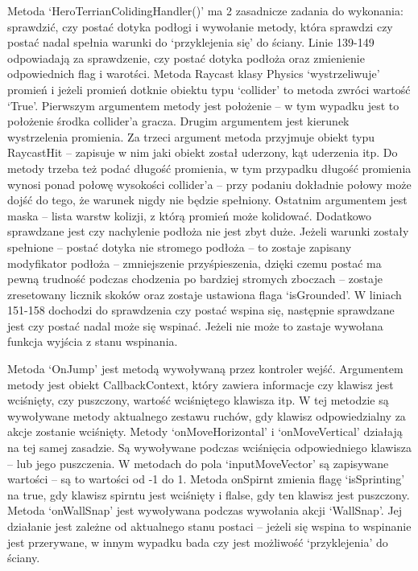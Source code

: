 \documentclass[12pt,twoside]{article}
\begin{document}
Metoda `HeroTerrianColidingHandler()' ma 2 zasadnicze zadania do wykonania:
sprawdzić, czy postać dotyka podłogi i wywołanie metody, która sprawdzi czy
postać nadal spełnia warunki do `przyklejenia się' do ściany. Linie 139-149
odpowiadają za sprawdzenie, czy postać dotyka podłoża oraz zmienienie
odpowiednich flag i warotści. Metoda Raycast klasy Physics `wystrzeliwuje'
promień i jeżeli promień dotknie obiektu  typu `collider' to metoda zwróci
wartość `True'. Pierwszym argumentem metody jest położenie -- w tym wypadku jest
to położenie środka collider’a gracza. Drugim argumentem jest kierunek
wystrzelenia promienia. Za trzeci argument metoda przyjmuje obiekt typu
RaycastHit -- zapisuje w nim jaki obiekt został uderzony, kąt uderzenia itp. Do
metody trzeba też podać długość promienia, w tym przypadku długość promienia
wynosi ponad połowę wysokości collider’a -- przy podaniu dokładnie połowy może
dojść do tego, że warunek nigdy nie będzie spełniony. Ostatnim argumentem jest
maska -- lista warstw kolizji, z którą promień może kolidować.  Dodatkowo
sprawdzane jest czy nachylenie podłoża nie jest zbyt duże.  Jeżeli warunki
zostały spełnione -- postać dotyka nie stromego podłoża -- to zostaje zapisany
modyfikator podłoża -- zmniejszenie przyśpieszenia, dzięki czemu postać ma pewną
trudność podczas chodzenia po bardziej stromych zboczach -- zostaje zresetowany
licznik skoków oraz zostaje ustawiona flaga `isGrounded'. W liniach 151-158
dochodzi do sprawdzenia czy postać wspina się, następnie sprawdzane jest czy
postać nadal może się wspinać. Jeżeli nie może to zastaje wywołana funkcja
wyjścia z stanu wspinania. 

Metoda `OnJump' jest metodą wywoływaną przez kontroler wejść. Argumentem metody
jest obiekt CallbackContext, który zawiera informacje czy klawisz jest
wciśnięty, czy puszczony, wartość wciśniętego klawisza itp. W tej metodzie są
wywoływane metody aktualnego zestawu ruchów, gdy klawisz odpowiedzialny za akcje
zostanie wciśnięty. Metody `onMoveHorizontal' i `onMoveVertical' działają na tej
samej zasadzie. Są wywoływane podczas wciśnięcia odpowiedniego klawisza -- lub
jego puszczenia. W metodach do pola `inputMoveVector' są zapisywane wartości –
są to wartości od -1 do 1. Metoda onSpirnt zmienia flagę `isSprinting' na true,
gdy klawisz spirntu jest wciśnięty i flalse, gdy ten klawisz jest puszczony.
Metoda `onWallSnap' jest wywoływana podczas wywołania akcji `WallSnap'. Jej
działanie jest zależne od aktualnego stanu postaci -- jeżeli się wspina to
wspinanie jest przerywane, w innym wypadku bada czy jest możliwość
`przyklejenia' do ściany. 
\end{document}
